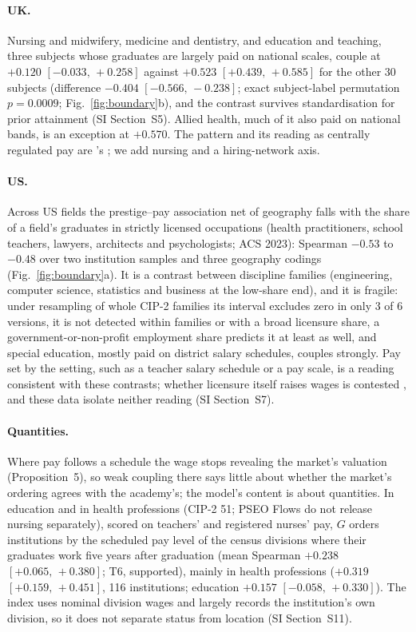 \documentclass[11pt]{article}
\newcommand{\SI}[1]{SI Section~S#1}
\newcommand{\SItheory}{\SI{11}}
\newcommand{\ci}[2]{$[#1,\allowbreak\,#2]$}
\begin{document}
\paragraph{UK.} Nursing and midwifery, medicine and dentistry, and education and teaching, three subjects whose
graduates are largely paid on national scales, couple at $+0.120$ \ci{-0.033}{+0.258} against $+0.523$
\ci{+0.439}{+0.585} for the other 30 subjects (difference $-0.404$ \ci{-0.566}{-0.238}; exact subject-label
permutation $p=0.0009$; Fig.~\ref{fig:boundary}b), and the contrast survives standardisation for prior attainment
(\SI{5}). Allied health, much of it also paid on national bands, is an exception at $+0.570$. The pattern and its
reading as centrally regulated pay are \citeauthor{britton2022how}'s \citeyearpar{britton2022how}; we add nursing
and a hiring-network axis.

\paragraph{US.} Across US fields the prestige--pay association net of geography falls with the share of a field's
graduates in strictly licensed occupations (health practitioners, school teachers, lawyers, architects and
psychologists; ACS 2023): Spearman $-0.53$ to $-0.48$ over two institution samples and three geography codings
(Fig.~\ref{fig:boundary}a). It is a contrast between discipline families (engineering, computer science, statistics and business at the
low-share end), and it is fragile: under resampling of whole CIP-2 families its interval excludes zero in only 3 of
6 versions, it is not detected within families or with a broad licensure share, a government-or-non-profit
employment share predicts it at least as well, and special education, mostly paid on district salary schedules,
couples strongly. Pay set by the setting, such as a teacher
salary schedule \citep{biasi2021labor} or a pay scale, is a reading consistent with these contrasts; whether
licensure itself raises wages is contested \citep{kleiner2013analyzing, redbird2017new}, and these data isolate
neither reading (\SI{7}).

\paragraph{Quantities.} Where pay follows a schedule the wage stops revealing the market's valuation
(Proposition~5), so weak coupling there says little about whether the market's ordering agrees with the
academy's; the model's content is about quantities. In education and in health professions (CIP-2 51; PSEO Flows
do not release nursing separately), scored on teachers' and registered nurses' pay, $G$ orders institutions by the
scheduled pay level of the census divisions where their graduates work five years after graduation (mean Spearman
$+0.238$ \ci{+0.065}{+0.380}; T6, supported), mainly in health professions ($+0.319$ \ci{+0.159}{+0.451}, 116
institutions; education $+0.157$ \ci{-0.058}{+0.330}). The index uses nominal division wages and largely records
the institution's own division, so it does not separate status from location (\SItheory).
\end{document}
